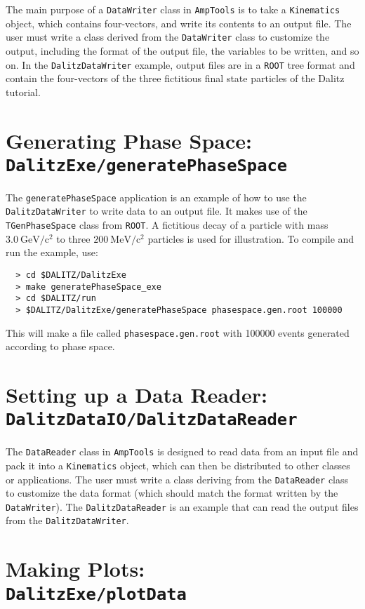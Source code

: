 \documentclass[10pt]{article}
\newcommand{\gevcc}{\mathrm{GeV/c^2}}
\newcommand{\mevcc}{\mathrm{MeV/c^2}}
\begin{document}
The main purpose of a {\tt DataWriter} class in {\tt AmpTools} is to take a {\tt Kinematics} object, which contains four-vectors, and write its contents to an output file.  The user must write a class derived from the {\tt DataWriter} class to customize the output, including the format of the output file, the variables to be written, and so on.  In the {\tt DalitzDataWriter} example, output files are in a {\tt ROOT} tree format and contain the four-vectors of the three fictitious final state particles of the Dalitz tutorial.

\section{Generating Phase Space: \\  
{\tt DalitzExe/generatePhaseSpace}}
\label{sec:ps}

The {\tt generatePhaseSpace} application is an example of how to use the {\tt DalitzDataWriter} to write data to an output file.  It makes use of the {\tt TGenPhaseSpace} class from {\tt ROOT}.  A fictitious decay of a particle with mass $3.0~\gevcc$ to three $200~\mevcc$ particles is used for illustration.  To compile and run the example, use:
\begin{verbatim}
  > cd $DALITZ/DalitzExe
  > make generatePhaseSpace_exe
  > cd $DALITZ/run
  > $DALITZ/DalitzExe/generatePhaseSpace phasespace.gen.root 100000
\end{verbatim}
This will make a file called {\tt phasespace.gen.root} with 100000 events generated according to phase space.

\section{Setting up a Data Reader: \\
{\tt DalitzDataIO/DalitzDataReader}}
\label{sec:dr}

The {\tt DataReader} class in {\tt AmpTools} is designed to read data from an input file and pack it into a {\tt Kinematics} object, which can then be distributed to other classes or applications.  The user must write a class deriving from the {\tt DataReader} class to customize the data format (which should match the format written by the {\tt DataWriter}).  The {\tt DalitzDataReader} is an example that can read the output files from the {\tt DalitzDataWriter}.

\section{Making Plots: \\
{\tt DalitzExe/plotData}}
\label{sec:plot}
\end{document}
